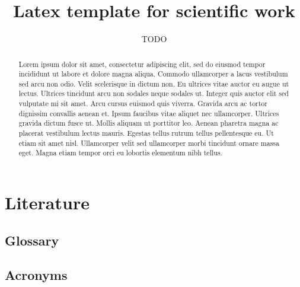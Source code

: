 \documentclass[a4paper, 11pt,abstract=on,usegeometry]{scrreprt}
\title{Latex template for scientific work}
\author{TODO}
\makeatletter
\renewcommand\listoftables{%
\section{\listtablename}%
\@starttoc{lot}%
}
\renewcommand\listoffigures{%
\section{\listfigurename}%
\@starttoc{lof}%
}
\newcommand\blankpage{%
\null
\thispagestyle{empty}%
\newpage}
\makeatother
\begin{document}

    \maketitle

    \begin{abstract}
        Lorem ipsum dolor sit amet, consectetur adipiscing elit, sed do eiusmod tempor incididunt ut labore et dolore magna aliqua. Commodo ullamcorper a lacus vestibulum sed arcu non odio. Velit scelerisque in dictum non. Eu ultrices vitae auctor eu augue ut lectus. Ultrices tincidunt arcu non sodales neque sodales ut. Integer quis auctor elit sed vulputate mi sit amet. Arcu cursus euismod quis viverra. Gravida arcu ac tortor dignissim convallis aenean et. Ipsum faucibus vitae aliquet nec ullamcorper. Ultrices gravida dictum fusce ut. Mollis aliquam ut porttitor leo. Aenean pharetra magna ac placerat vestibulum lectus mauris. Egestas tellus rutrum tellus pellentesque eu. Ut etiam sit amet nisl. Ullamcorper velit sed ullamcorper morbi tincidunt ornare massa eget. Magna etiam tempor orci eu lobortis elementum nibh tellus.

    \end{abstract}
    \glsresetall
    \clearpage
    
    \tableofcontents

    \clearpage
    
    \glsresetall


    

    \renewcommand{\thechapter}{A}
    \chapter{Literature}
    \begin{flushleft}
        
        
    \end{flushleft}
    \clearpage
    \section{Glossary} %
    \printglossary %
    \clearpage
    \listoffigures
    \clearpage
    \listoftables
    \clearpage
    \section{Acronyms} %
    \printglossary[type=\acronymtype]

    \renewcommand{\thechapter}{B}
\end{document}
